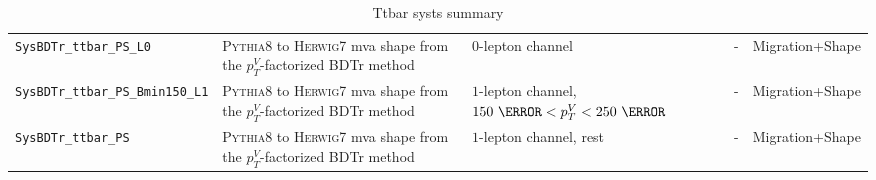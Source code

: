 \begin{table}
{\begin{tabular}{lllll}
      \texttt{SysBDTr\_ttbar\_PS\_L0} & \textsc{Pythia8} to \textsc{Herwig7} mva shape from the $p_T^V$-factorized BDTr method  & $0$-lepton channel & - & Migration+Shape \\
      \texttt{SysBDTr\_ttbar\_PS\_Bmin150\_L1} & \textsc{Pythia8} to \textsc{Herwig7} mva shape from the $p_T^V$-factorized BDTr method  & $1$-lepton channel, $150~\GeV< p_T^V <250~\GeV$ & - & Migration+Shape \\
      \texttt{SysBDTr\_ttbar\_PS} & \textsc{Pythia8} to \textsc{Herwig7} mva shape from the $p_T^V$-factorized BDTr method  & $1$-lepton channel, rest & - & Migration+Shape \\
\bottomrule
\end{tabular}
}
\caption[A summary of systematic uncertainties on the $t\bar{t}$ process.]{Ttbar
  systs summary}
\label{tab:ttbar-systs}
\end{table}